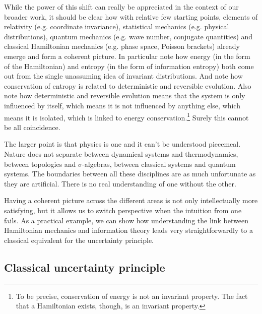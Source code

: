 \documentclass[11pt]{article}
\begin{document}
While the power of this shift can really be appreciated in the context of our broader work, it should be clear how with relative few starting points, elements of relativity (e.g. coordinate invariance), statistical mechanics (e.g. physical distributions), quantum mechanics (e.g. wave number, conjugate quantities) and classical Hamiltonian mechanics (e.g. phase space, Poisson brackets) already emerge and form a coherent picture. In particular note how energy (in the form of the Hamiltonian) and entropy (in the form of information entropy) both come out from the single unassuming idea of invariant distributions. And note how conservation of entropy is related to deterministic and reversible evolution. Also note how deterministic and reversible evolution means that the system is only influenced by itself, which means it is not influenced by anything else, which means it is isolated, which is linked to energy conservation.\footnote{To be precise, conservation of energy is not an invariant property. The fact that a Hamiltonian exists, though, is an invariant property.} Surely this cannot be all coincidence.

The larger point is that physics is one and it can't be understood piecemeal. Nature does not separate between dynamical systems and thermodynamics, between topologies and $\sigma$-algebras, between classical systems and quantum systems. The boundaries between all these disciplines are as much unfortunate as they are artificial. There is no real understanding of one without the other.

Having a coherent picture across the different areas is not only intellectually more satisfying, but it allows us to switch perspective when the intuition from one fails. As a practical example, we can show how understanding the link between Hamiltonian mechanics and information theory leads very straightforwardly to a classical equivalent for the uncertainty principle.

\subsection*{Classical uncertainty principle}
\end{document}
